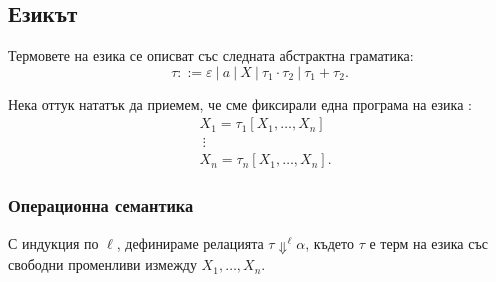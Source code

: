 \subsection{Езикът \CFG}

Термовете на езика \CFG се описват със следната абстрактна граматика:
\[\tau ::= \varepsilon\ |\ a\ |\ X\ |\ \tau_1 \cdot \tau_2\ |\ \tau_1 + \tau_2.\]

Нека оттук нататък да приемем, че сме фиксирали една програма на езика \CFG:
\begin{align*}
  & X_1 = \tau_1[X_1,\dots,X_n]\\
  & \ \vdots\\
  & X_n = \tau_n[X_1,\dots,X_n].
\end{align*}


\subsubsection*{Операционна семантика}

С индукция по $\ell$, дефинираме релацията $\tau \Downarrow^\ell \alpha$,
където $\tau$ е терм на езика \CFG със свободни променливи измежду $X_1,\dots, X_n$.

